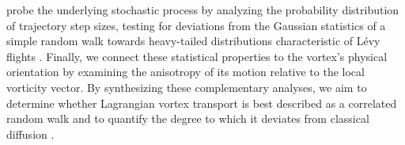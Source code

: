 \documentclass[]{article}
\begin{document}
probe the underlying stochastic process by analyzing the probability distribution of trajectory step sizes, testing for deviations from the Gaussian statistics of a simple random walk towards heavy-tailed distributions characteristic of Lévy flights  \citep{kumar2025trappingtransportinertialparticles}. Finally, we connect these statistical properties to the vortex's physical orientation by examining the anisotropy of its motion relative to the local vorticity vector. By synthesizing these complementary analyses, we aim to determine whether Lagrangian vortex transport is best described as a correlated random walk and to quantify the degree to which it deviates from classical diffusion  \citep{kumar2025trappingtransportinertialparticles,aulnette2025transportsphericalmicroparticles3d}.
\end{document}
